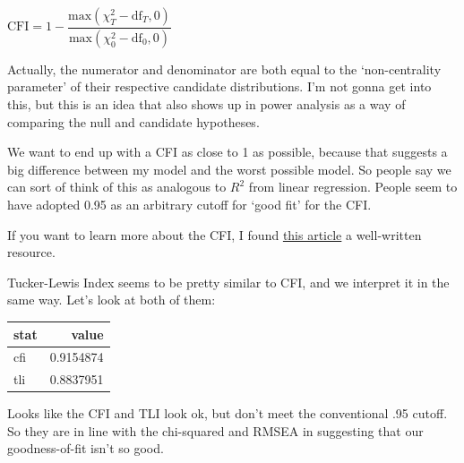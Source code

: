 \documentclass[
  letterpaper,
  DIV=11,
  numbers=noendperiod]{scrreprt}
\newenvironment{Shaded}{\begin{snugshade}}{\end{snugshade}}
\newcommand{\AttributeTok}[1]{\textcolor[rgb]{0.40,0.45,0.13}{#1}}
\newcommand{\CommentTok}[1]{\textcolor[rgb]{0.37,0.37,0.37}{#1}}
\newcommand{\FunctionTok}[1]{\textcolor[rgb]{0.28,0.35,0.67}{#1}}
\newcommand{\NormalTok}[1]{\textcolor[rgb]{0.00,0.23,0.31}{#1}}
\newcommand{\SpecialCharTok}[1]{\textcolor[rgb]{0.37,0.37,0.37}{#1}}
\newcommand{\StringTok}[1]{\textcolor[rgb]{0.13,0.47,0.30}{#1}}
\begin{document}
\(\text{CFI} = 1 - \dfrac{\text{max}(χ^2_T - \text{df}_T, 0)}{\text{max}(χ^2_0 - \text{df}_0, 0)}\)

Actually, the numerator and denominator are both equal to the
`non-centrality parameter' of their respective candidate distributions.
I'm not gonna get into this, but this is an idea that also shows up in
power analysis as a way of comparing the null and candidate hypotheses.

We want to end up with a CFI as close to 1 as possible, because that
suggests a big difference between my model and the worst possible model.
So people say we can sort of think of this as analogous to \(R^2\) from
linear regression. People seem to have adopted 0.95 as an arbitrary
cutoff for `good fit' for the CFI.

If you want to learn more about the CFI, I found
\href{https://scholarworks.umass.edu/cgi/viewcontent.cgi?article=1561\&context=pare}{this
article} a well-written resource.

Tucker-Lewis Index seems to be pretty similar to CFI, and we interpret
it in the same way. Let's look at both of them:

\begin{Shaded}
\end{Shaded}

\begin{longtable}[]{@{}lr@{}}
\toprule()
stat & value \\
\midrule()
\endhead
cfi & 0.9154874 \\
tli & 0.8837951 \\
\bottomrule()
\end{longtable}

Looks like the CFI and TLI look ok, but don't meet the conventional .95
cutoff. So they are in line with the chi-squared and RMSEA in suggesting
that our goodness-of-fit isn't so good.
\end{document}
